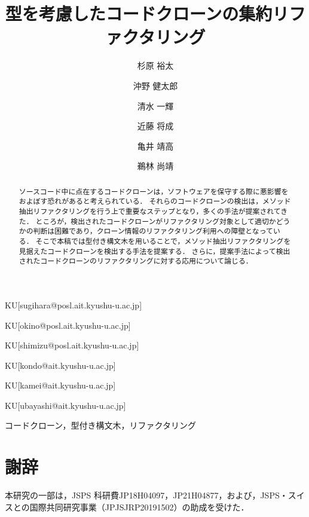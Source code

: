 \documentclass[submit,techrep,noauthor]{ipsj}
\begin{document}
\title{型を考慮したコードクローンの集約リファクタリング}



\author{杉原 裕太}{}{KU}[sugihara@posl.ait.kyushu-u.ac.jp]
\author{沖野 健太郎}{}{KU}[okino@posl.ait.kyushu-u.ac.jp]
\author{清水 一輝}{}{KU}[shimizu@posl.ait.kyushu-u.ac.jp]
\author{近藤 将成}{}{KU}[kondo@ait.kyushu-u.ac.jp]
\author{亀井 靖高}{}{KU}[kamei@ait.kyushu-u.ac.jp]
\author{鵜林 尚靖}{}{KU}[ubayashi@ait.kyushu-u.ac.jp]

\begin{abstract}
ソースコード中に点在するコードクローンは，ソフトウェアを保守する際に悪影響をおよぼす恐れがあると考えられている．
それらのコードクローンの検出は，メソッド抽出リファクタリングを行う上で重要なステップとなり，多くの手法が提案されてきた．
ところが，検出されたコードクローンがリファクタリング対象として適切かどうかの判断は困難であり，クローン情報のリファクタリング利用への障壁となっている．
そこで本稿では型付き構文木を用いることで，メソッド抽出リファクタリングを見据えたコードクローンを検出する手法を提案する．
さらに，提案手法によって検出されたコードクローンのリファクタリングに対する応用について論じる．
\end{abstract}

\begin{jkeyword}
  コードクローン，型付き構文木，リファクタリング
\end{jkeyword}

\maketitle

\setcounter{page}{1}

{\large







}

\section*{謝辞}
本研究の一部は，JSPS 科研費JP18H04097，JP21H04877，および，JSPS・スイスとの国際共同研究事業（JPJSJRP20191502）の助成を受けた．


%


\end{document}
